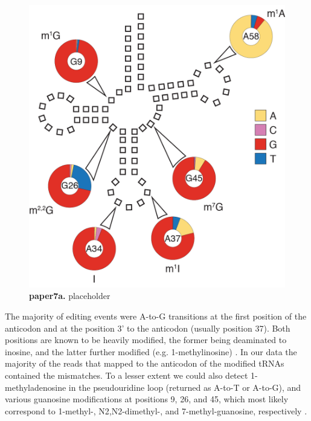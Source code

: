 \documentclass[12pt]{rockefeller}
\begin{document}
\begin{figure}[!ht]%
\centering
\includegraphics[scale=1]{paper7a.png}%
\caption[paper7a]
{\textbf{paper7a.}
placeholder}
\centering
\label{paper7a}%
\end{figure}

The majority of editing events were A-to-G transitions at the first position of the anticodon and at the position 3’ to the anticodon (usually position 37). Both positions are known to be heavily modified, the former being deaminated to inosine, and the latter further modified (e.g. 1-methylinosine) \cite{Machnicka:2013ky}. In our data the majority of the reads that mapped to the anticodon of the modified tRNAs contained the mismatches. To a lesser extent we could also detect 1-methyladenosine in the pseudouridine loop (returned as A-to-T or A-to-G), and various guanosine modifications at positions 9, 26, and 45, which most likely correspond to 1-methyl-, N2,N2-dimethyl-, and 7-methyl-guanosine, respectively \cite{Machnicka:2013ky}.
\end{document}
